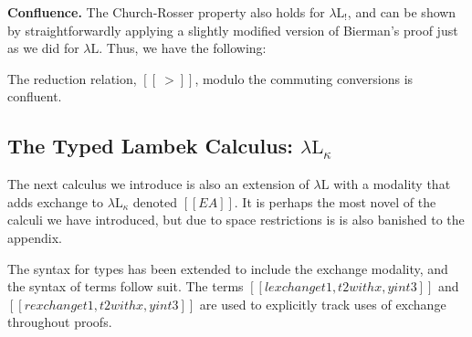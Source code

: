 \documentclass{llncs}
\begin{document}
\textbf{Confluence.} The Church-Rosser property also holds for
$\lambda\text{L}_!$, and can be shown by straightforwardly applying a
slightly modified version of Bierman's proof \cite{Bierman:1994} just
as we did for $\lambda\text{L}$.  Thus, we have the following:
\begin{theorem}[Confluence]
  \label{thm:confluence}
  The reduction relation, $[[~>]]$, modulo the commuting conversions
  is confluent.
\end{theorem}

\fi 
\iffalse
\subsection{The Typed Lambek Calculus: $\lambda\text{L}_\kappa$}
\label{subsec:the_typed_lambek_calculus:lambda-l-kappa}

The next calculus we introduce is also an extension of
$\lambda\text{L}$ with a modality that adds exchange to
$\lambda\text{L}_\kappa$ denoted $[[E A]]$.  It is perhaps the most
novel of the calculi we have introduced, but due to space restrictions is is also banished to the appendix. 

\iffalse
The syntax of types
and terms of $\lambda\text{L}$ are extended as follows:
\[
\begin{array}{cllllll}
  \text{(types)}    & [[A]] & := & \cdots \mid [[E A]]\\
  \text{(terms)}    & [[t]] & := & \cdots \mid [[lexchange t1,t2 with x,y in t3]] \mid [[rexchange t1,t2 with x,y in t3]] \mid 
  \\ & & & [[promoteE t' for t'' in t]] \mid [[derelictE t]]\\
\end{array}
\]
\fi 

The syntax for types has been extended to include the exchange
modality, and the syntax of terms follow suit.  The terms $[[lexchange
    t1,t2 with x,y in t3]]$ and $[[rexchange t1,t2 with x,y in t3]]$
are used to explicitly track uses of exchange throughout proofs.  

\iffalse
We add the following typing rules to $\lambda\text{L}$:
\begin{mathpar}
  \LdruleTXXEOne{} \and
  \LdruleTXXETwo{} \and
  \LdruleTXXEr{} \and
  \LdruleTXXEl{} 
\end{mathpar}

\begin{figure}[h]
  \small
  \begin{mdframed}
    \begin{mathpar}      
      \LdruleRXXBetaEDR{} \and
      \LdruleRXXNatEl{} \and
      \LdruleRXXNatEr{} 
    \end{mathpar}
  \end{mdframed}
  \caption{Rewriting Rules for The Typed Lambek Calculus: $\lambda\text{L}_\kappa$}
  \label{fig:rewrite-LE}
\end{figure}
\noindent
The reduction rules are in Figure~\ref{fig:rewrite-LE}, and are vary
similar to the rules from $\lambda\text{L}_!$.
\fi 
\end{document}
